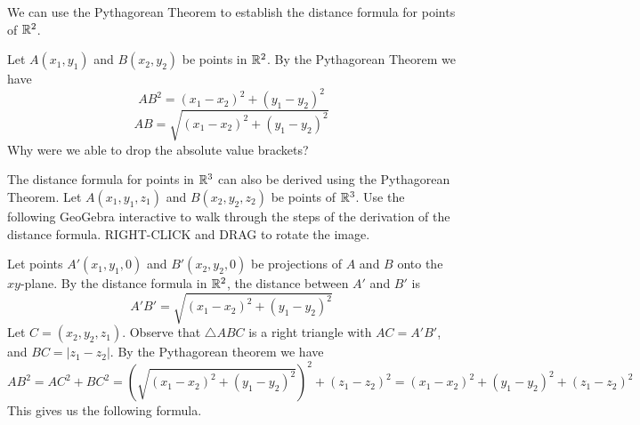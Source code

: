 \documentclass{ximera}
\begin{document}
We can use the Pythagorean Theorem to establish the distance formula for points of $\mathbb{R}^2$.

\begin{center}
\end{center}

Let $A(x_1, y_1)$ and $B(x_2, y_2)$ be points in $\mathbb{R}^2$.  By the Pythagorean Theorem we have
$$AB^2=(x_1-x_2)^2+(y_1-y_2)^2$$
$$AB=\sqrt{(x_1-x_2)^2+(y_1-y_2)^2}$$
Why were we able to drop the absolute value brackets?

The distance formula for points in $\mathbb{R}^3$ can also be derived using the Pythagorean Theorem.  Let $A(x_1, y_1, z_1)$ and $B(x_2, y_2, z_2)$ be points of $\mathbb{R}^3$.  Use the following GeoGebra interactive to walk through the steps of the derivation of the distance formula.  RIGHT-CLICK and DRAG to rotate the image.


\begin{onlineOnly}
\begin{center} 
\end{center}
\end{onlineOnly}

Let points $A'(x_1, y_1, 0)$ and $B'(x_2, y_2,0)$ be projections of $A$ and $B$ onto the $xy$-plane.  By the distance formula in $\mathbb{R}^2$, the distance between $A'$ and $B'$ is
 $$A'B'=\sqrt{(x_1-x_2)^2+(y_1-y_2)^2}$$
 Let $C=(x_2, y_2, z_1)$.  Observe that $\triangle{ABC}$ is a right triangle with $AC=A'B'$, and $BC=|z_1-z_2|$.  By the Pythagorean theorem we have
 $$AB^2=AC^2+BC^2=\left(\sqrt{(x_1-x_2)^2+(y_1-y_2)^2}\right)^2+(z_1-z_2)^2=(x_1-x_2)^2+(y_1-y_2)^2+(z_1-z_2)^2$$
 This gives us the following formula.
\end{document}
